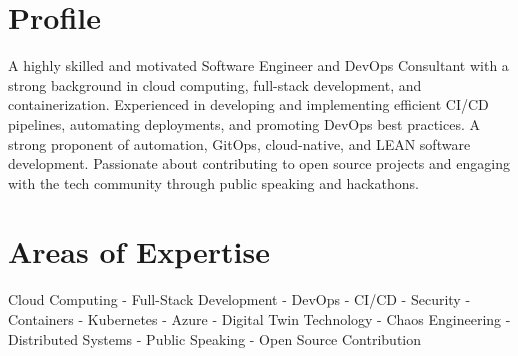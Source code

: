 


\section{Profile}
{A highly skilled and motivated Software Engineer and DevOps Consultant with a strong background in cloud computing, full-stack development, and containerization. Experienced in developing and implementing efficient CI/CD pipelines, automating deployments, and promoting DevOps best practices. A strong proponent of automation, GitOps, cloud-native, and LEAN software development. Passionate about contributing to open source projects and engaging with the tech community through public speaking and hackathons.}

\section{Areas of Expertise}
{Cloud Computing - Full-Stack Development - DevOps - CI/CD - Security - Containers - Kubernetes - Azure -  Digital Twin Technology - Chaos Engineering - Distributed Systems - Public Speaking - Open Source Contribution}


